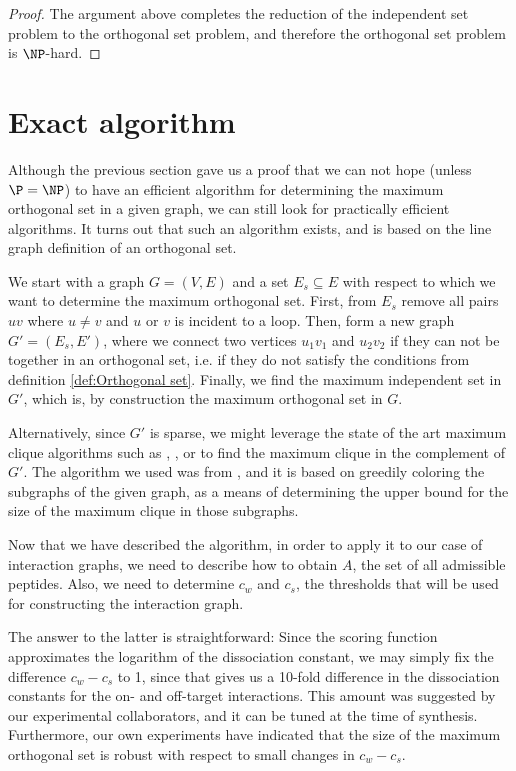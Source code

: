 \documentclass[12pt,a4paper,titlepage,openany]{report}
\begin{document}
\begin{proof}
	The argument above completes the reduction of the independent set problem to the orthogonal set problem, and therefore the orthogonal set problem is $\NP$-hard.
\end{proof}

\section{Exact algorithm}\label{sec:exact-algorithm}
Although the previous section gave us a proof that we can not hope (unless $\P=\NP$) to have an efficient algorithm for determining the maximum orthogonal set in a given graph, we can still look for practically efficient algorithms. It turns out that such an algorithm exists, and is based on the line graph definition of an orthogonal set.

We start with a graph $G = (V, E)$ and a set $E_s \subseteq E$ with respect to which we want to determine the maximum orthogonal set. First, from $E_s$ remove all pairs $uv$ where $u \neq v$ and $u$ or $v$ is incident to a loop. Then, form a new graph $G' = (E_s, E')$, where we connect two vertices $u_1v_1$ and $u_2v_2$ if they can not be together in an orthogonal set, i.e. if they do not satisfy the conditions from definition \ref{def:Orthogonal set}.
Finally, we find the maximum independent set in $G'$, which is, by construction the maximum orthogonal set in $G$.

Alternatively, since $G'$ is sparse, we might leverage the state of the art maximum clique algorithms such as \cite{depolli2013exact}, \cite{san2013improved}, or \cite{tomita2010simple} to find the maximum clique in the complement of $G'$. The algorithm we used was from \cite{depolli2013exact}, and it is based on greedily coloring the subgraphs of the given graph, as a means of determining the upper bound for the size of the maximum clique in those subgraphs.

Now that we have described the algorithm, in order to apply it to our case of interaction graphs, we need to describe how to obtain $A$, the set of all admissible peptides. Also, we need to determine $c_w$ and $c_s$, the thresholds that will be used for constructing the interaction graph. 

The answer to the latter is straightforward: Since the scoring function approximates the logarithm of the dissociation constant, we may simply fix the difference $c_w-c_s$ to 1, since that gives us a 10-fold difference in the dissociation constants for the on- and off-target interactions. This amount was suggested by our experimental collaborators, and it can be tuned at the time of synthesis. Furthermore, our own experiments have indicated that the size of the maximum orthogonal set is robust with respect to small changes in $c_w - c_s$.
\end{document}
